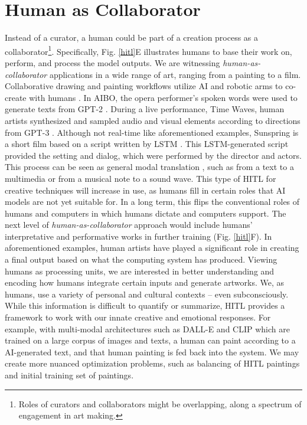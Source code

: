 \documentclass[letterpaper]{article} %
\begin{document}
\vspace{-1.72mm}
\section{Human as Collaborator}

Instead of a curator, a human could be part of a creation process as a collaborator\footnote{Roles of curators and collaborators might be overlapping, along a spectrum of engagement in art making.}. Specifically, Fig. \ref{hitl}E illustrates humans to base their work on, perform, and process the model outputs. We are witnessing \emph{human-as-collaborator} applications in a wide range of art, ranging from a painting to a film. Collaborative drawing and painting workflows utilize AI and robotic arms to co-create with humans \cite{Jansen2021}. In AIBO, the opera performer's spoken words were used to generate texts from GPT-2 \cite{Pearlman2021}. During a live performance, Time Waves, human artists synthesized and sampled audio and visual elements according to directions from GPT-3 \cite{TimeWaves}. Although not real-time like aforementioned examples, Sunspring \cite{Sunspring} is a short film based on a script written by LSTM \cite{Hochreiter1997}. This LSTM-generated script provided the setting and dialog, which were performed by the director and actors. This process can be seen as general modal translation \cite{Specia2016}, such as from a text to a multimedia or from a musical note to a sound wave. This type of HITL for creative techniques will increase in use, as humans fill in certain roles that AI models are not yet suitable for. In a long term, this flips the conventional roles of humans and computers in which humans dictate and computers support.  The next level of \emph{human-as-collaborator} approach would include humans' interpretative and performative works in further training (Fig. \ref{hitl}F). In aforementioned examples, human artists have played a significant role in creating a final output based on what the computing system has produced. Viewing humans as processing units, we are interested in better understanding and encoding how humans integrate certain inputs and generate artworks. We, as humans, use a variety of personal and cultural contexts -- even subconsciously. While this information is difficult to quantify or summarize, HITL provides a framework to work with our innate creative and emotional responses. For example, with multi-modal architectures such as DALL-E \cite{Ramesh2021} and CLIP \cite{Radford2021} which are trained on a large corpus of images and texts, a human can paint according to a AI-generated text, and that human painting is fed back into the system. We may create more nuanced optimization problems, such as balancing of HITL paintings and initial training set of paintings.
\end{document}
